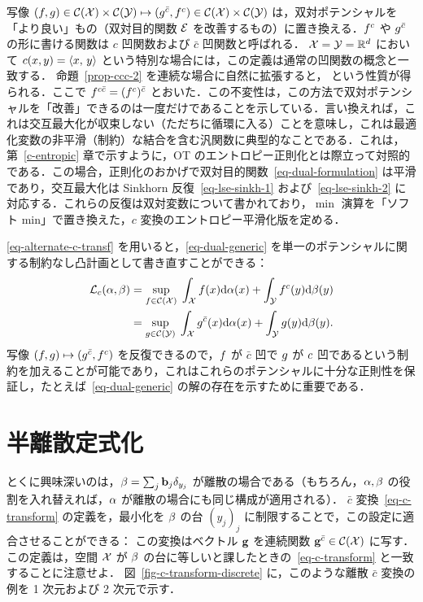 写像 $(f,g) \in \mathcal{C}(\mathcal{X}) \times \mathcal{C}(\mathcal{Y}) \mapsto (g^{\bar{c}},f^c) \in \mathcal{C}(\mathcal{X}) \times \mathcal{C}(\mathcal{Y})$ は，双対ポテンシャルを「より良い」もの（双対目的関数 $\mathcal{E}$ を改善するもの）に置き換える．$f^c$ や $g^{\bar{c}}$ の形に書ける関数は $c$ 凹関数および $\bar c$ 凹関数と呼ばれる．
%
$\mathcal{X}=\mathcal{Y}=\mathbb{R}^d$ において $c(x,y)=\langle x,\,y\rangle$ という特別な場合には，この定義は通常の凹関数の概念と一致する．
%
命題~\ref{prop-ccc-2} を連続な場合に自然に拡張すると，
という性質が得られる．ここで $f^{c\bar c} = (f^{c})^{\bar c}$ とおいた．この不変性は，この方法で双対ポテンシャルを「改善」できるのは一度だけであることを示している．言い換えれば，これは交互最大化が収束しない（ただちに循環に入る）ことを意味し，これは最適化変数の非平滑（制約）な結合を含む汎関数に典型的なことである．これは，第~\ref{c-entropic} 章で示すように，OT のエントロピー正則化とは際立って対照的である．この場合，正則化のおかげで双対目的関数~\eqref{eq-dual-formulation} は平滑であり，交互最大化は Sinkhorn 反復~\eqref{eq-lse-sinkh-1} および~\eqref{eq-lse-sinkh-2} に対応する．これらの反復は双対変数について書かれており，$\min$ 演算を「ソフト min」で置き換えた，$c$ 変換のエントロピー平滑化版を定める．

\eqref{eq-alternate-c-transf} を用いると，\eqref{eq-dual-generic} を単一のポテンシャルに関する制約なし凸計画として書き直すことができる：
\begin{align}\label{eq-semi-dual-cont}
	\mathcal{L}_c(\alpha,\beta)
		&= \underset{f \in \mathcal{C}(\mathcal{X})}{\sup}\;
			\int_{\mathcal{X}} f(x) \mathrm{d}\alpha(x) + \int_{\mathcal{Y}} f^{c}(y) \mathrm{d}\beta(y) \\
		&= \underset{g \in \mathcal{C}(\mathcal{Y})}{\sup}\;
			\int_{\mathcal{X}} g^{\bar{c}}(x) \mathrm{d}\alpha(x) + \int_{\mathcal{Y}} g(y) \mathrm{d}\beta(y).
\end{align}
写像 $(f,g) \mapsto (g^{\bar{c}},f^c)$ を反復できるので，$f$ が $\bar c$ 凹で $g$ が $c$ 凹であるという制約を加えることが可能であり，これはこれらのポテンシャルに十分な正則性を保証し，たとえば~\eqref{eq-dual-generic} の解の存在を示すために重要である．

\section{半離散定式化}
\label{s-semidiscrete}

とくに興味深いのは，$\beta = \sum_j \mathrm{\textbf{b}}_j \delta_{y_j}$ が離散の場合である（もちろん，$\alpha,\beta$ の役割を入れ替えれば，$\alpha$ が離散の場合にも同じ構成が適用される）．
%
$\bar c$ 変換~\eqref{eq-c-transform} の定義を，最小化を $\beta$ の台 $(y_j)_j$ に制限することで，この設定に適合させることができる：
この変換はベクトル $\mathrm{\textbf{g}}$ を連続関数 $\mathrm{\textbf{g}}^{\bar {c}} \in \mathcal{C}(\mathcal{X})$ に写す．
%
この定義は，空間 $\mathcal{X}$ が $\beta$ の台に等しいと課したときの~\eqref{eq-c-transform} と一致することに注意せよ．
%
図~\ref{fig-c-transform-discrete} に，このような離散 $\bar c$ 変換の例を 1 次元および 2 次元で示す．



